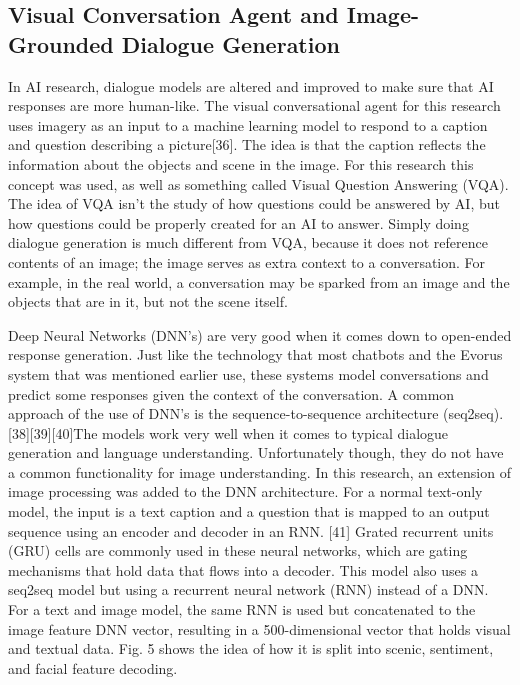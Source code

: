 \documentclass[letterpaper, 10 pt, conference]{IEEEtran}
\begin{document}
\subsection{Visual Conversation Agent and Image-Grounded Dialogue Generation}
In AI research, dialogue models are altered and improved to make sure that AI responses are more human-like. The visual conversational agent for this research uses imagery as an input to a machine learning model to respond to a caption and question describing a picture[36]. The idea is that the caption reflects the information about the objects and scene in the image. For this research this concept was used, as well as something called Visual Question Answering (VQA). The idea of VQA isn't the study of how questions could be answered by AI, but how questions could be properly created for an AI to answer. Simply doing dialogue generation is much different from VQA, because it does not reference contents of an image; the image serves as extra context to a conversation. For example, in the real world, a conversation may be sparked from an image and the objects that are in it, but not the scene itself.
\par Deep Neural Networks (DNN's) are very good when it comes down to open-ended response generation. Just like the technology that most chatbots and the Evorus system that was mentioned earlier use, these systems model conversations and predict some responses given the context of the conversation. A common approach of the use of DNN's is the sequence-to-sequence architecture (seq2seq). [38][39][40]The models work very well when it comes to typical dialogue generation and language understanding. Unfortunately though, they do not have a common functionality for image understanding. In this research, an extension of image processing was added to the DNN architecture. For a normal text-only model, the input is a text caption and a question that is mapped to an output sequence using an encoder and decoder in an RNN. [41] Grated recurrent units (GRU) cells are commonly used in these neural networks, which are gating mechanisms that hold data that flows into a decoder. This model also uses a seq2seq model but using a recurrent neural network (RNN) instead of a DNN. For a text and image model, the same RNN is used but concatenated to the image feature DNN vector, resulting in a 500-dimensional vector that holds visual and textual data.  Fig. 5 shows the  idea of how it is split into scenic, sentiment, and facial feature decoding.
\end{document}
